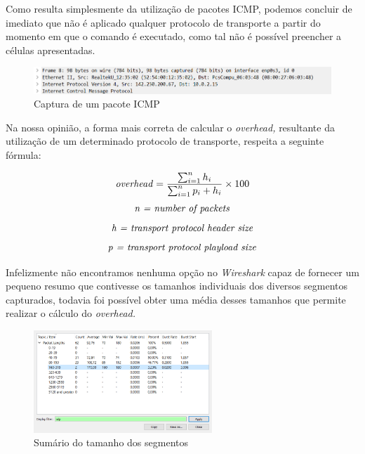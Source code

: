     Como resulta  simplesmente da utilização de pacotes ICMP, podemos concluir de imediato que não é aplicado qualquer protocolo de transporte a partir do momento em que o comando é executado, como tal não é possível preencher a células apresentadas.

    \begin{figure}
        \centering
        \includegraphics[width=\textwidth]{Imagens/13.png}
        \caption{Captura de um pacote ICMP}
        \vspace{-10pt}
    \end{figure}
    
    Na nossa opinião, a forma mais correta de calcular o \textit{overhead,} resultante da utilização de um determinado protocolo de transporte, respeita a seguinte fórmula:

    \vspace{-10pt}
        
    \[
      \text{\textit{overhead}} 
      = \dfrac
        {\sum_{i=1}^{n} h_i}
        {\sum_{i=1}^{n} p_i + h_i}
        \times 100
    \]
    \vspace{-10pt}
    \[\text{\textit{n = number of packets}}\]
    \vspace{-22pt}
    \[\text{\textit{h = transport protocol header size}}\]
    \vspace{-22pt}
    \[\text{\textit{p = transport protocol playload size}}\]

    
    Infelizmente não encontramos nenhuma opção no \textit{Wireshark} capaz de fornecer um pequeno resumo que contivesse os tamanhos individuais dos diversos segmentos capturados, todavia foi possível obter uma média desses tamanhos que permite realizar o cálculo do \textit{overhead.}

    \newpage
    \begin{figure}[hb!]
        \centering
        \includegraphics[width=0.6\textwidth]{Imagens/12.png}
        \caption{Sumário do tamanho dos segmentos}
        \vspace{-10pt}
    \end{figure}


